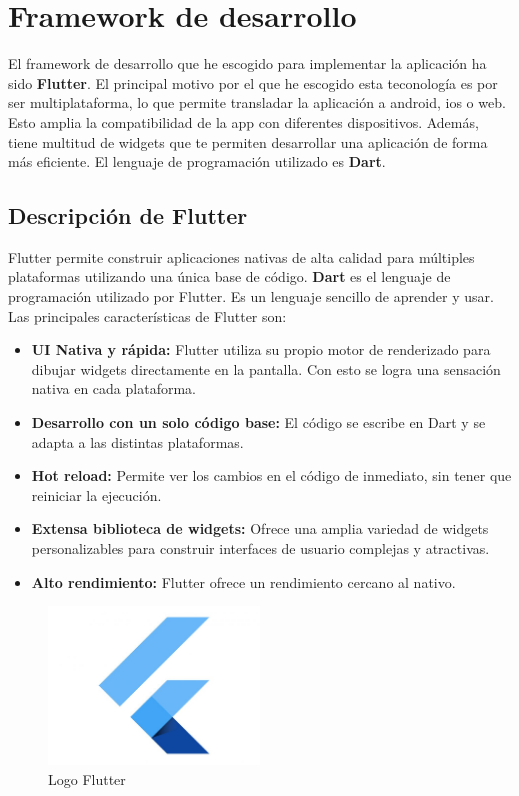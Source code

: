\section{Framework de desarrollo}

El framework de desarrollo que he escogido para implementar la aplicación ha sido \textbf{Flutter}. El principal motivo por el que he escogido esta teconología es por ser multiplataforma, lo que permite transladar la aplicación a android, ios o web. Esto amplia la compatibilidad de la app con diferentes dispositivos. Además, tiene multitud de widgets que te permiten desarrollar una aplicación de forma más eficiente. El lenguaje de programación utilizado es \textbf{Dart}. 


\subsection{Descripción de Flutter}

Flutter permite construir aplicaciones nativas de alta calidad para múltiples plataformas utilizando una única base de código. \textbf{Dart} es el lenguaje de programación utilizado por Flutter. Es un lenguaje sencillo de aprender y usar. Las principales características de Flutter son:  \cite{flutter}

\begin{itemize}
	\item \textbf{UI Nativa y rápida: } Flutter utiliza su propio motor de renderizado para dibujar widgets directamente en la pantalla. Con esto se logra una sensación nativa en cada plataforma. 
	\item \textbf{Desarrollo con un solo código base: } El código se escribe en Dart y se adapta a las distintas plataformas. 
	\item \textbf{Hot reload: } Permite ver los cambios en el código de inmediato, sin tener que reiniciar la ejecución. 
	\item \textbf{Extensa biblioteca de widgets: } Ofrece una amplia variedad de widgets personalizables para construir interfaces de usuario complejas y atractivas. 
	\item \textbf{Alto rendimiento: } Flutter ofrece un rendimiento cercano al nativo. 
\end{itemize}

\begin{figure}[H]
	\centering
	\includegraphics[width=0.5\textwidth]{imagenes/imagenesTecnologias/flutter.jpg}
	\caption{Logo Flutter}
\end{figure}


